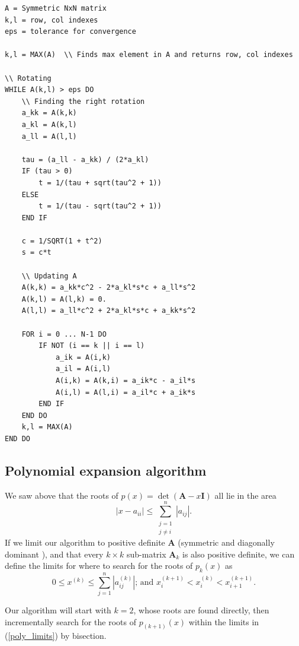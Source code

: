 \documentclass[]{article}
\begin{document}
\begin{lstlisting}[caption={Jacobi eigenvalue algorithm},label={lst:jacobi}]
A = Symmetric NxN matrix
k,l = row, col indexes
eps = tolerance for convergence

k,l = MAX(A)  \\ Finds max element in A and returns row, col indexes

\\ Rotating
WHILE A(k,l) > eps DO 
	\\ Finding the right rotation
	a_kk = A(k,k)
	a_kl = A(k,l)
	a_ll = A(l,l)

	tau = (a_ll - a_kk) / (2*a_kl)
	IF (tau > 0)
		t = 1/(tau + sqrt(tau^2 + 1))
	ELSE
		t = 1/(tau - sqrt(tau^2 + 1))
	END IF
	
	c = 1/SQRT(1 + t^2)
	s = c*t
	
	\\ Updating A
	A(k,k) = a_kk*c^2 - 2*a_kl*s*c + a_ll*s^2
	A(k,l) = A(l,k) = 0.
	A(l,l) = a_ll*c^2 + 2*a_kl*s*c + a_kk*s^2
	
	FOR i = 0 ... N-1 DO
		IF NOT (i == k || i == l)
			a_ik = A(i,k)
			a_il = A(i,l)
			A(i,k) = A(k,i) = a_ik*c - a_il*s
			A(i,l) = A(l,i) = a_il*c + a_ik*s
		END IF
	END DO
	k,l = MAX(A)
END DO

\end{lstlisting}




\subsection{Polynomial expansion algorithm}
We saw above that the roots of $p(x) = \det(\mathbf{A} - x\mathbf{I})$ all lie in the area
\[
|x - a_{ii}| \leq \sum_{\substack{j=1 \\ j \neq i}}^{n} |a_{ij}|.
\]
If we limit our algorithm to positive definite $\mathbf{A}$ (symmetric and diagonally dominant \cite{diagdom}), and that every $k \times k$ sub-matrix $\mathbf{A}_k$ is also positive definite, we can define the limits for where to search for the roots of $p_k(x)$ as
\begin{equation}
\label{poly_limits}
	0 \le x^{(k)} \le \sum_{j=1}^{n} |a_{ij}^{(k)}| \text{;    and    } x_i^{(k+1)} < x_i^{(k)} < x_{i+1}^{(k+1)}.
\end{equation}

Our algorithm will start with $k=2$, whose roots are found directly, then incrementally search for the roots of $p_(k+1)(x)$ within the limits in (\ref{poly_limits}) by bisection. 
\end{document}
